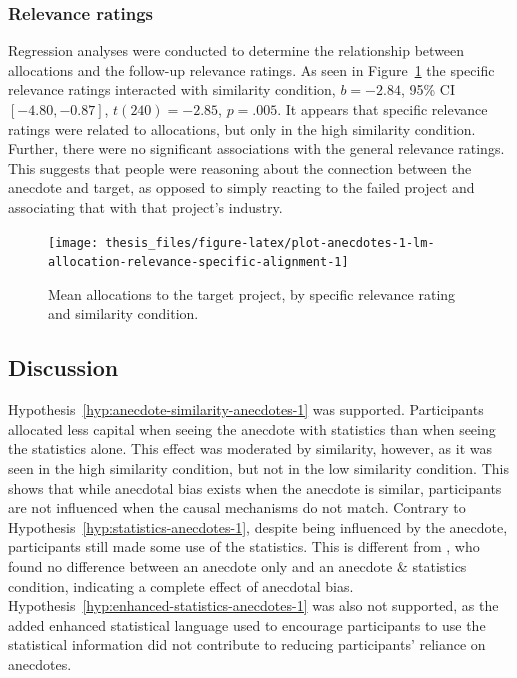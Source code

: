\documentclass[a4paper, nobind, dvipsnames]{templates/ociamthesis}
\theoremstyle{definition}
\theoremstyle{definition}
\theoremstyle{definition}
\theoremstyle{definition}
\theoremstyle{remark}
\begin{document}
\subsubsection{Relevance ratings}

Regression analyses were conducted to determine the relationship between
allocations and the follow-up relevance ratings. As seen in
Figure~\ref{fig:plot-anecdotes-1-lm-allocation-relevance-specific-alignment}
the specific relevance ratings interacted with similarity condition,
\(b = -2.84\), 95\% CI \([-4.80, -0.87]\), \(t(240) = -2.85\), \(p = .005\). It appears
that specific relevance ratings were related to allocations, but only in the
high similarity condition. Further, there were no significant associations with
the general relevance ratings. This suggests that people were reasoning about
the connection between the anecdote and target, as opposed to simply reacting to
the failed project and associating that with that project's industry.



\begin{figure}
\texttt{[image: thesis\_files/figure-latex/plot-anecdotes-1-lm-allocation-relevance-specific-alignment-1]} \caption{Mean allocations to the target project, by specific relevance rating and similarity condition.}\label{fig:plot-anecdotes-1-lm-allocation-relevance-specific-alignment}
\end{figure}

\subsection{Discussion}

Hypothesis~\ref{hyp:anecdote-similarity-anecdotes-1} was supported.
Participants allocated less capital when seeing the anecdote with statistics
than when seeing the statistics alone. This effect was moderated by similarity,
however, as it was seen in the high similarity condition, but not in the low
similarity condition. This shows that while anecdotal bias exists when the
anecdote is similar, participants are not influenced when the causal mechanisms
do not match. Contrary to Hypothesis~\ref{hyp:statistics-anecdotes-1}, despite
being influenced by the anecdote, participants still made some use of the
statistics. This is different from \textcite{wainberg2013}, who found no difference
between an anecdote only and an anecdote \& statistics condition, indicating a
complete effect of anecdotal bias.
Hypothesis~\ref{hyp:enhanced-statistics-anecdotes-1} was also not supported, as
the added enhanced statistical language used to encourage participants to use
the statistical information did not contribute to reducing participants'
reliance on anecdotes.
\end{document}
